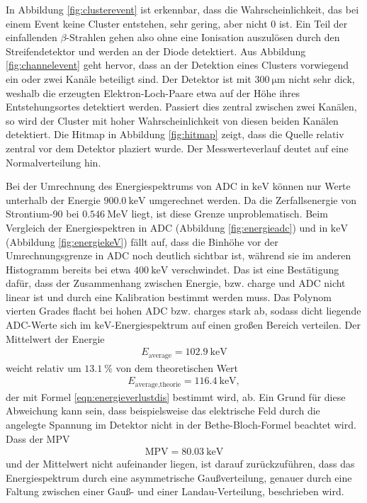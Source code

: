 In Abbildung \ref{fig:clusterevent} ist erkennbar, dass die Wahrscheinlichkeit, das bei einem Event keine Cluster entstehen, sehr gering, aber nicht 0 ist.
Ein Teil der einfallenden $\beta$-Strahlen gehen also ohne eine Ionisation auszulösen durch den Streifendetektor und werden an der Diode detektiert.
Aus Abbildung \ref{fig:channelevent} geht hervor, dass an der Detektion eines Clusters vorwiegend ein oder zwei Kanäle beteiligt sind. Der Detektor ist mit
$\SI{300}{\micro\meter}$ nicht sehr dick, weshalb die erzeugten Elektron-Loch-Paare etwa auf der Höhe ihres Entstehungsortes detektiert werden. Passiert dies zentral zwischen
zwei Kanälen, so wird der Cluster mit hoher Wahrscheinlichkeit von diesen beiden Kanälen detektiert. Die Hitmap in Abbildung \ref{fig:hitmap} zeigt, dass die Quelle relativ zentral vor dem Detektor
plaziert wurde. Der Messwerteverlauf deutet auf eine Normalverteilung hin.

Bei der Umrechnung des Energiespektrums von ADC in $\si{\kilo\electronvolt}$ können nur Werte unterhalb der Energie $\SI{900.0}{\kilo\electronvolt}$ umgerechnet werden.
Da die Zerfallsenergie von Strontium-90 bei $\SI{0.546}{\mega\electronvolt}$ \cite{anleitung} liegt, ist diese Grenze unproblematisch.
Beim Vergleich der Energiespektren in ADC (Abbildung \ref{fig:energieadc}) und in $\si{\kilo\electronvolt}$ (Abbildung \ref{fig:energiekeV}) fällt auf, dass die Binhöhe vor der Umrechnungsgrenze in ADC noch deutlich sichtbar ist, während
sie im anderen Histogramm bereits bei etwa $\SI{400}{\kilo\electronvolt}$ verschwindet. Das ist eine Bestätigung dafür, dass der Zusammenhang zwischen
Energie, bzw. charge und ADC nicht linear ist und durch eine Kalibration bestimmt werden muss. Das Polynom vierten Grades flacht bei hohen ADC bzw. charges stark ab, sodass
dicht liegende ADC-Werte sich im $\si{\kilo\electronvolt}$-Energiespektrum auf einen großen Bereich verteilen. Der Mittelwert der Energie
\begin{align}
  E_\text{average} = \SI{102.9}{\kilo\electronvolt}
\end{align}
weicht relativ um $\SI{13.1}{\percent}$ von dem theoretischen Wert
\begin{align}
  E_\text{average,theorie} = \SI{116.4}{\kilo\electronvolt},
\end{align}
der mit Formel \eqref{eqn:energieverlustdis} bestimmt wird, ab. Ein Grund für diese Abweichung kann sein, dass beispielsweise das elektrische Feld durch die angelegte Spannung im Detektor nicht in
der Bethe-Bloch-Formel beachtet wird. Dass der MPV
\begin{align}
  \text{MPV} = \SI{80.03}{\kilo\electronvolt}
\end{align}
und der Mittelwert nicht aufeinander liegen, ist darauf zurückzuführen, dass das Energiespektrum durch eine asymmetrische Gaußverteilung, genauer
durch eine Faltung zwischen einer Gauß- und einer Landau-Verteilung, beschrieben wird.
